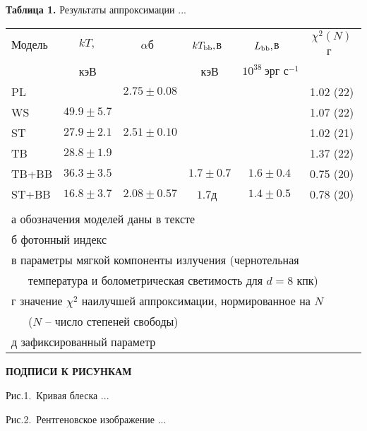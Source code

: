 \documentclass[12pt]{article}
\begin{document}
\clearpage
\begin{table}[t]

\vspace{6mm}
\centering
{{\bf Таблица 1.} Результаты аппроксимации ...}\label{meansp} 

\vspace{5mm}\begin{tabular}{l|c|c|c|c|c} \hline\hline
{Модель}&$kT,$&$\alpha$б\ &$kT_{\rm bb},$в\ &$L_{\rm bb},$в\ &$\chi^2(N)$г\ \\ 
        & кэВ&            & кэВ         &$10^{38} \ \mbox{эрг с}^{-1}$&\\ \hline
PL   &              &$2.75\pm0.08$&            &           &1.02 (22)\\
WS   &$ 49.9\pm5.7 $&             &            &           &1.07 (22)\\
ST   &$ 27.9\pm2.1 $&$2.51\pm0.10$&            &           &1.02 (21)\\
TB   &$ 28.8\pm1.9 $&             &            &           &1.37 (22)\\
TB+BB&$ 36.3\pm3.5 $&             &$1.7\pm0.7$ &$1.6\pm0.4$&0.75 (20)\\
ST+BB&$ 16.8\pm3.7 $&$2.08\pm0.57$&$1.7$д\    &$1.4\pm0.5$&0.78 (20)\\ \hline
\multicolumn{6}{l}{}\\ [-3mm]
\multicolumn{6}{l}{а обозначения моделей даны в тексте}\\
\multicolumn{6}{l}{б фотонный индекс}\\
\multicolumn{6}{l}{в параметры мягкой компоненты излучения
  (чернотельная}\\
\multicolumn{6}{l}{\ \ \  температура и болометрическая
  светимость для $d=8$ кпк)}\\
\multicolumn{6}{l}{г значение $\chi^2$ наилучшей
  аппроксимации, нормированное на $N$}\\
\multicolumn{6}{l}{\ \ \ ($N$ -- число степеней
  свободы)}\\
\multicolumn{6}{l}{д зафиксированный параметр} \\
\end{tabular}
\end{table}
\clearpage

\centerline {\bf ПОДПИСИ К РИСУНКАМ}
\vspace{1 cm} 

Рис.1.~Кривая блеска ...

Рис.2.~Рентгеновское изображение ...

\clearpage
\begin{figure}[h]
\epsfxsize=19cm
\hspace{-2cm}%

\caption{\rm }
\end{figure}

\end{document}
